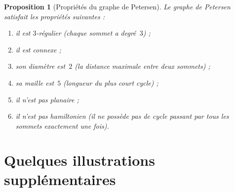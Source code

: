 \documentclass[12pt,a4paper,openany]{book}
\theoremstyle{definition}
\theoremstyle{plain}
\newtheorem{proposition}[definition]{Proposition}
\theoremstyle{remark}
\begin{document}
\begin{proposition}[Propriétés du graphe de Petersen]
\label{prop:petersen-props}
Le graphe de Petersen satisfait les propriétés suivantes :
\begin{enumerate}[label=(\roman*)]
  \item il est $3$-régulier (chaque sommet a degré~$3$) ;
  \item il est connexe ;
  \item son diamètre est~$2$ (la distance maximale entre deux sommets) ;
  \item sa maille est~$5$ (longueur du plus court cycle) ;
  \item il n'est pas planaire ;
  \item il n'est pas hamiltonien (il ne possède pas de cycle passant par
    tous les sommets exactement une fois).
\end{enumerate}
\end{proposition}

\section{Quelques illustrations supplémentaires}
\label{sec:illustrations}
\end{document}
